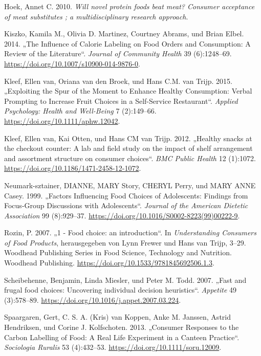 \documentclass[12pt,ngerman,]{article}
\begin{document}
\leavevmode\hypertarget{ref-hoek_will_2010}{}%
Hoek, Annet C. 2010. \emph{Will novel protein foods beat meat? Consumer
acceptance of meat substitutes ; a multidisciplinary research approach}.

\leavevmode\hypertarget{ref-kiszko_influence_2014}{}%
Kiszko, Kamila M., Olivia D. Martinez, Courtney Abrams, und Brian Elbel.
2014. „The Influence of Calorie Labeling on Food Orders and Consumption:
A Review of the Literature``. \emph{Journal of Community Health} 39
(6):1248--69. \url{https://doi.org/10.1007/s10900-014-9876-0}.

\leavevmode\hypertarget{ref-van_kleef_exploiting_2015}{}%
Kleef, Ellen van, Oriana van den Broek, und Hans C.M. van Trijp. 2015.
„Exploiting the Spur of the Moment to Enhance Healthy Consumption:
Verbal Prompting to Increase Fruit Choices in a Self-Service
Restaurant``. \emph{Applied Psychology: Health and Well-Being} 7
(2):149--66. \url{https://doi.org/10.1111/aphw.12042}.

\leavevmode\hypertarget{ref-van_kleef_healthy_2012}{}%
Kleef, Ellen van, Kai Otten, und Hans CM van Trijp. 2012. „Healthy
snacks at the checkout counter: A lab and field study on the impact of
shelf arrangement and assortment structure on consumer choices``.
\emph{BMC Public Health} 12 (1):1072.
\url{https://doi.org/10.1186/1471-2458-12-1072}.

\leavevmode\hypertarget{ref-neumark-sztainer_factors_1999}{}%
Neumark-sztainer, DIANNE, MARY Story, CHERYL Perry, und MARY ANNE Casey.
1999. „Factors Influencing Food Choices of Adolescents: Findings from
Focus-Group Discussions with Adolescents``. \emph{Journal of the
American Dietetic Association} 99 (8):929--37.
\url{https://doi.org/10.1016/S0002-8223(99)00222-9}.

\leavevmode\hypertarget{ref-rozin_1_2007}{}%
Rozin, P. 2007. „1 - Food choice: an introduction``. In
\emph{Understanding Consumers of Food Products}, herausgegeben von Lynn
Frewer und Hans van Trijp, 3--29. Woodhead Publishing Series in Food
Science, Technology and Nutrition. Woodhead Publishing.
\url{https://doi.org/10.1533/9781845692506.1.3}.

\leavevmode\hypertarget{ref-scheibehenne_fast_2007}{}%
Scheibehenne, Benjamin, Linda Miesler, und Peter M. Todd. 2007. „Fast
and frugal food choices: Uncovering individual decision heuristics``.
\emph{Appetite} 49 (3):578--89.
\url{https://doi.org/10.1016/j.appet.2007.03.224}.

\leavevmode\hypertarget{ref-spaargaren_consumer_2013}{}%
Spaargaren, Gert, C. S. A. (Kris) van Koppen, Anke M. Janssen, Astrid
Hendriksen, und Corine J. Kolfschoten. 2013. „Consumer Responses to the
Carbon Labelling of Food: A Real Life Experiment in a Canteen
Practice``. \emph{Sociologia Ruralis} 53 (4):432--53.
\url{https://doi.org/10.1111/soru.12009}.
\end{document}
